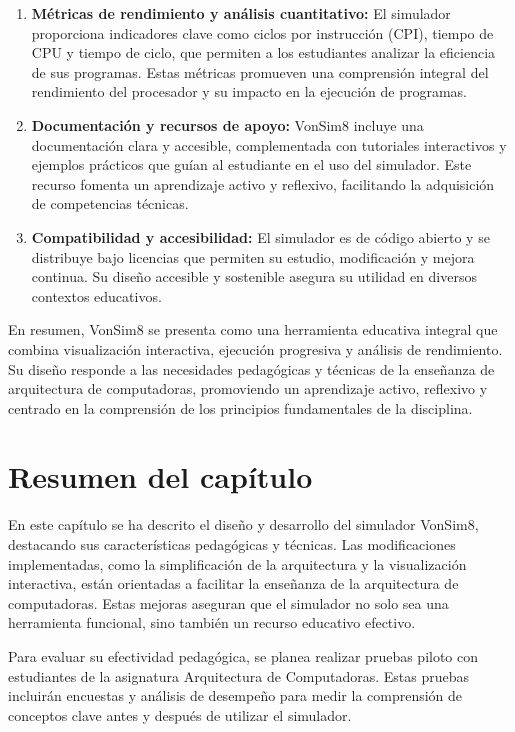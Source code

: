 \documentclass[12pt,oneside]{templates/unerthesis}
\begin{document}
\begin{enumerate}
\item
  \textbf{Métricas de rendimiento y análisis cuantitativo:}
  El simulador proporciona indicadores clave como ciclos por instrucción (CPI), tiempo de CPU y tiempo de ciclo, que permiten a los estudiantes analizar la eficiencia de sus programas. Estas métricas promueven una comprensión integral del rendimiento del procesador y su impacto en la ejecución de programas.
\item
  \textbf{Documentación y recursos de apoyo:}
  VonSim8 incluye una documentación clara y accesible, complementada con tutoriales interactivos y ejemplos prácticos que guían al estudiante en el uso del simulador. Este recurso fomenta un aprendizaje activo y reflexivo, facilitando la adquisición de competencias técnicas.
\item
  \textbf{Compatibilidad y accesibilidad:}
  El simulador es de código abierto y se distribuye bajo licencias que permiten su estudio, modificación y mejora continua. Su diseño accesible y sostenible asegura su utilidad en diversos contextos educativos.
\end{enumerate}

En resumen, VonSim8 se presenta como una herramienta educativa integral que combina visualización interactiva, ejecución progresiva y análisis de rendimiento. Su diseño responde a las necesidades pedagógicas y técnicas de la enseñanza de arquitectura de computadoras, promoviendo un aprendizaje activo, reflexivo y centrado en la comprensión de los principios fundamentales de la disciplina.

\hypertarget{resumen-del-capuxedtulo}{%
\section{Resumen del capítulo}\label{resumen-del-capuxedtulo}}

En este capítulo se ha descrito el diseño y desarrollo del simulador VonSim8, destacando sus características pedagógicas y técnicas. Las modificaciones implementadas, como la simplificación de la arquitectura y la visualización interactiva, están orientadas a facilitar la enseñanza de la arquitectura de computadoras. Estas mejoras aseguran que el simulador no solo sea una herramienta funcional, sino también un recurso educativo efectivo.

Para evaluar su efectividad pedagógica, se planea realizar pruebas piloto con estudiantes de la asignatura Arquitectura de Computadoras. Estas pruebas incluirán encuestas y análisis de desempeño para medir la comprensión de conceptos clave antes y después de utilizar el simulador.
\end{document}
